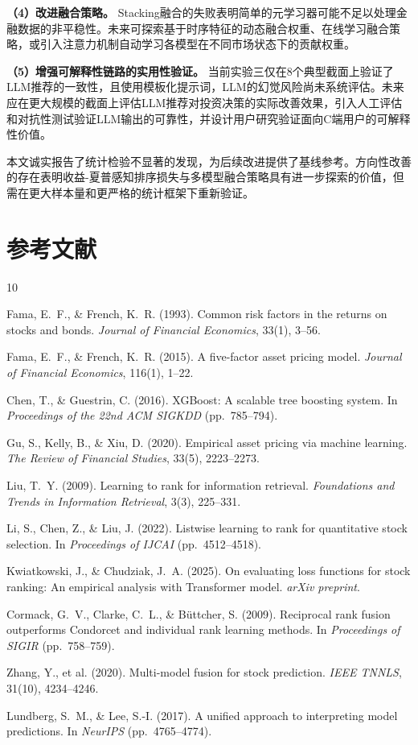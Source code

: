 \documentclass[11pt,a4paper]{ctexart}
\begin{document}
\textbf{（4）改进融合策略。} Stacking融合的失败表明简单的元学习器可能不足以处理金融数据的非平稳性。未来可探索基于时序特征的动态融合权重、在线学习融合策略，或引入注意力机制自动学习各模型在不同市场状态下的贡献权重。

\textbf{（5）增强可解释性链路的实用性验证。} 当前实验三仅在8个典型截面上验证了LLM推荐的一致性，且使用模板化提示词，LLM的幻觉风险尚未系统评估。未来应在更大规模的截面上评估LLM推荐对投资决策的实际改善效果，引入人工评估和对抗性测试验证LLM输出的可靠性，并设计用户研究验证面向C端用户的可解释性价值。

本文诚实报告了统计检验不显著的发现，为后续改进提供了基线参考。方向性改善的存在表明收益-夏普感知排序损失与多模型融合策略具有进一步探索的价值，但需在更大样本量和更严格的统计框架下重新验证。


\section{参考文献}
\begin{thebibliography}{10}

Fama, E.~F., \& French, K.~R. (1993).
Common risk factors in the returns on stocks and bonds.
\textit{Journal of Financial Economics}, 33(1), 3--56.

Fama, E.~F., \& French, K.~R. (2015).
A five-factor asset pricing model.
\textit{Journal of Financial Economics}, 116(1), 1--22.

Chen, T., \& Guestrin, C. (2016).
XGBoost: A scalable tree boosting system.
In \textit{Proceedings of the 22nd ACM SIGKDD} (pp.~785--794).

Gu, S., Kelly, B., \& Xiu, D. (2020).
Empirical asset pricing via machine learning.
\textit{The Review of Financial Studies}, 33(5), 2223--2273.

Liu, T.~Y. (2009).
Learning to rank for information retrieval.
\textit{Foundations and Trends in Information Retrieval}, 3(3), 225--331.

Li, S., Chen, Z., \& Liu, J. (2022).
Listwise learning to rank for quantitative stock selection.
In \textit{Proceedings of IJCAI} (pp.~4512--4518).

Kwiatkowski, J., \& Chudziak, J.~A. (2025).
On evaluating loss functions for stock ranking: An empirical analysis with Transformer model.
\textit{arXiv preprint}.

Cormack, G.~V., Clarke, C.~L., \& B{\"u}ttcher, S. (2009).
Reciprocal rank fusion outperforms Condorcet and individual rank learning methods.
In \textit{Proceedings of SIGIR} (pp.~758--759).

Zhang, Y., et al. (2020).
Multi-model fusion for stock prediction.
\textit{IEEE TNNLS}, 31(10), 4234--4246.

Lundberg, S.~M., \& Lee, S.-I. (2017).
A unified approach to interpreting model predictions.
In \textit{NeurIPS} (pp.~4765--4774).

\end{thebibliography}
\end{document}
